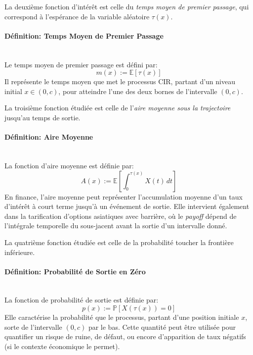 La deuxième fonction d'intérêt est celle du \textit{temps moyen de premier passage}, qui correspond à l'espérance de la variable aléatoire $\tau(x)$.
\paragraph{Définition: Temps Moyen de Premier Passage}\mbox{}\\
Le temps moyen de premier passage est défini par:
\begin{equation}\label{mean}
    m(x):= \mathds{E}[\tau(x)]
\end{equation}
Il représente le temps moyen que met le processus \acs{CIR}, partant d'un niveau initial $x \in (0,c)$, pour atteindre l'une des deux bornes de l'intervalle $(0,c)$.

La troisième fonction étudiée est celle de l'\textit{aire moyenne sous la trajectoire} jusqu'au temps de sortie.
\paragraph{Définition: Aire Moyenne}\mbox{}\\
La fonction d'aire moyenne est définie par:
\begin{equation}\label{area}
    A(x):= \mathds{E} \left[ \int_0^{\tau(x)} X(t)\,dt \right]
\end{equation}
En finance, l'aire moyenne peut représenter l'accumulation moyenne d'un taux d'intérêt à court terme jusqu'à un événement de sortie. Elle intervient également dans la tarification d'options asiatiques avec barrière, où le \textit{payoff} dépend de l'intégrale temporelle du sous-jacent avant la sortie d'un intervalle donné.

La quatrième fonction étudiée est celle de la probabilité toucher la frontière inférieure.
\paragraph{Définition: Probabilité de Sortie en Zéro}\mbox{}\\
La fonction de probabilité de sortie est définie par:
\begin{equation}\label{zero_exit_probability}
    p(x):=\mathds{P}[X(\tau(x))=0]
\end{equation}
Elle caractérise la probabilité que le processus, partant d'une position initiale $x$, sorte de l'intervalle $(0,c)$ par le bas. Cette quantité peut être utilisée pour quantifier un risque de ruine, de défaut, ou encore d'apparition de taux négatifs (si le contexte économique le permet).

